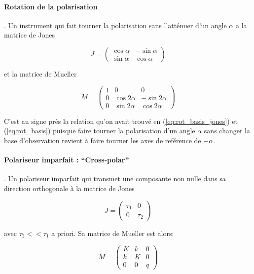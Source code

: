 \documentclass[a4paper,10pt]{article}
\begin{document}
\paragraph{Rotation de la polarisation}. Un instrument qui fait
tourner la polarisation sans l'att\'enuer d'un angle $\alpha$ a la
matrice de Jones

\begin{equation}
J = \left(\begin{array}{rr}
\cos\alpha & -\sin\alpha \\
\sin\alpha & \cos\alpha \end{array}\right)
\end{equation}

et la matrice de Mueller

\begin{equation}
M = \left(\begin{array}{rrr}
1 & 0 & 0\\
0 & \cos2\alpha & -\sin2\alpha \\
0 & \sin2\alpha & \cos2\alpha\end{array}\right)
\end{equation}

C'est au signe pr\`es la relation qu'on avait trouv\'e en
(\ref{eq:rot_basis_jones}) et (\ref{eq:rot_basis}) puisque faire
tourner la polarisation d'un angle $\alpha$ sans changer la base
d'observation revient \`a faire tourner les axes de ref\'erence de
$-\alpha$.

\paragraph{Polariseur imparfait : ``Cross-polar''}. Un polariseur
imparfait qui transmet une composante non nulle dans sa direction
orthogonale \`a la matrice de Jones

\begin{equation}
J = \left(\begin{array}{rr}
\tau_1 & 0\\
0 & \tau_2\end{array}\right)
\end{equation}

avec $\tau_2 << \tau_1$ a priori. Sa matrice de Mueller est alors:

\begin{equation}
M = \left(\begin{array}{rrr}
K & k & 0 \\
k & K & 0 \\
0 & 0 & q
\end{array}\right)
\label{eq:mueller_xpol}
\end{equation}
\end{document}
